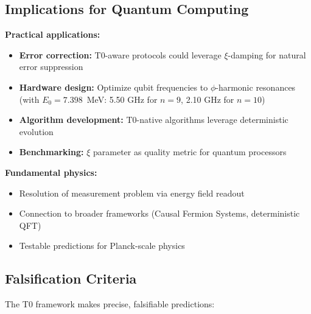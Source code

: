 \subsection{Implications for Quantum Computing}

\textbf{Practical applications:}
\begin{itemize}
	\item \textbf{Error correction:} T0-aware protocols could leverage $\xi$-damping for natural error suppression
	\item \textbf{Hardware design:} Optimize qubit frequencies to $\phi$-harmonic resonances (with $E_0 = 7.398$~MeV: 5.50 GHz for $n = 9$, 2.10 GHz for $n = 10$)
	\item \textbf{Algorithm development:} T0-native algorithms leverage deterministic evolution
	\item \textbf{Benchmarking:} $\xi$ parameter as quality metric for quantum processors
\end{itemize}

\textbf{Fundamental physics:}
\begin{itemize}
	\item Resolution of measurement problem via energy field readout
	\item Connection to broader frameworks (Causal Fermion Systems, deterministic QFT)
	\item Testable predictions for Planck-scale physics
\end{itemize}

\subsection{Falsification Criteria}

The T0 framework makes precise, falsifiable predictions:

